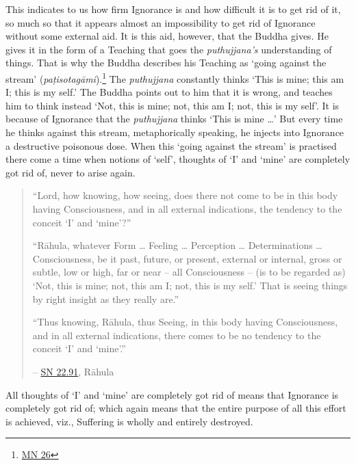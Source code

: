 This indicates to us how firm Ignorance is and how difficult it is to get rid of it, so much so that it appears almost an impossibility to get rid of Ignorance without some external aid. It is this aid, however, that the Buddha gives. He gives it in the form of a Teaching that goes  the \emph{puthujjana's} understanding of things. That is why the Buddha describes his Teaching as `going against the stream' (\emph{paṭisotagāmi}).\footnote{\href{https://suttacentral.net/mn26/en/bodhi}{MN 26}} The \emph{puthujjana} constantly thinks `This is mine; this am I; this is my self.' The Buddha points out to him that it is wrong, and teaches him to think instead `Not, this is mine; not, this am I; not, this is my self'. It is because of Ignorance that the \emph{puthujjana} thinks `This is mine \ldots\hspace{0pt}' But every time he thinks against this stream, metaphorically speaking, he injects into Ignorance a destructive poisonous dose. When this `going against the stream' is practised there come a time when  notions of `self',  thoughts of `I' and `mine' are completely got rid of, never to arise again.

\begin{quote}
``Lord, how knowing, how seeing, does there not come to be in this body having Consciousness, and in all external indications, the tendency to the conceit `I' and `mine'?''

``Rāhula, whatever Form \ldots\hspace{0pt} Feeling \ldots\hspace{0pt} Perception \ldots\hspace{0pt} Determinations \ldots\hspace{0pt} Consciousness, be it past, future, or present, external or internal, gross or subtle, low or high, far or near -- all Consciousness -- (is to be regarded as) `Not, this is mine; not, this am I; not, this is my self.' That is seeing things by right insight as they really are.''

``Thus knowing, Rāhula, thus Seeing, in this body having Consciousness, and in all external indications, there comes to be no tendency to the conceit `I' and `mine'.''

 -- \href{https://suttacentral.net/sn22.91/en/bodhi}{SN 22.91}, Rāhula
\end{quote}

All thoughts of `I' and `mine' are completely got rid of means that Ignorance is completely got rid of; which again means that the entire purpose of all this effort is achieved, viz., Suffering is wholly and entirely destroyed.

